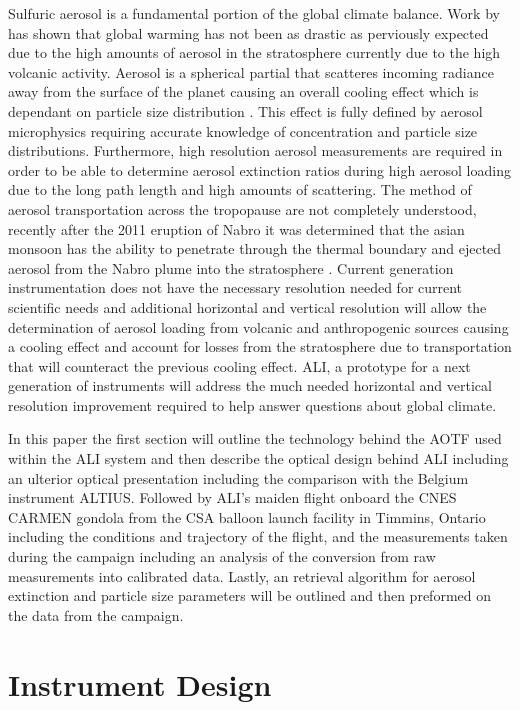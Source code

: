 \documentclass[12pt]{article}
\begin{document}
Sulfuric aerosol is a fundamental portion of the global climate balance. Work by \cite{Andreae2005} has shown that global warming has not been as drastic as perviously expected due to the high amounts of aerosol in the stratosphere currently due to the high volcanic activity. Aerosol is a spherical partial that scatteres incoming radiance away from the surface of the planet causing an overall cooling effect which is dependant on particle size distribution \citep{Kiehl1993}. This effect is fully defined by aerosol microphysics requiring accurate knowledge of concentration and particle size distributions. Furthermore, high resolution aerosol measurements are required in order to be able to determine aerosol extinction ratios during high aerosol loading due to the long path length and high amounts of scattering. The method of aerosol transportation across the tropopause are not completely understood, recently after the 2011 eruption of Nabro it was determined that the asian monsoon has the ability to penetrate through the thermal boundary and ejected aerosol from the Nabro plume into the stratosphere \citep{Bourassa2012c}. Current generation instrumentation does not have the necessary resolution needed for current scientific needs and additional horizontal and vertical resolution will allow the determination of aerosol loading from volcanic and anthropogenic sources causing a cooling effect and account for losses from the stratosphere due to transportation that will counteract the previous cooling effect. ALI, a prototype for a next generation of instruments will address the much needed horizontal and vertical resolution improvement required to help answer questions about global climate.

In this paper the first section will outline the technology behind the AOTF used within the ALI system and then describe the optical design behind ALI including an ulterior optical presentation including the comparison with the Belgium instrument ALTIUS. Followed by ALI's maiden flight onboard the CNES CARMEN gondola from the CSA balloon launch facility in Timmins, Ontario including the conditions and trajectory of the flight, and the measurements taken during the campaign including an analysis of the conversion from raw measurements into calibrated data. Lastly, an retrieval algorithm for aerosol extinction and particle size parameters will be outlined and then preformed on the data from the campaign.

\section{Instrument Design}
\end{document}
